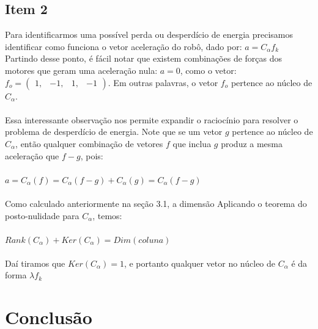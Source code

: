 \documentclass{article}
\begin{document}
\subsection{Item 2}
Para identificarmos uma possível perda ou desperdício de energia precisamos identificar como funciona o vetor aceleração do robô, dado por: 
$ a = C_{\alpha}f_{k}$ Partindo desse ponto, é fácil notar que existem combinações de forças dos motores que geram uma aceleração nula:
$ a = 0 $, como o vetor: $f_{o} = \begin{pmatrix} 1,&-1,&1,&-1\end{pmatrix}$. Em outras palavras, o vetor $f_{o}$ pertence ao núcleo de $C_{\alpha}$.
\\ \\
Essa interessante observação nos permite expandir o raciocínio para resolver o problema de desperdício de energia. Note que se um vetor $g$ pertence ao núcleo de $C_{\alpha}$, então qualquer combinação de vetores $f$ que inclua $g$
produz a mesma aceleração que $f - g$, pois:\\
\\  $ a = C_{\alpha}(f) = C_{\alpha}(f-g) + C_{\alpha}(g) = C_{\alpha}(f-g)$
\\ \\
Como calculado anteriormente na seção 3.1, a dimensão
Aplicando o teorema do posto-nulidade para $C_{\alpha}$, temos:
\\  \\ $ Rank(C_{\alpha}) + Ker(C_{\alpha}) = Dim(coluna)$ \\ \\
Daí tiramos que $Ker(C_{\alpha}) = 1 $, e portanto qualquer vetor no núcleo de $C_{\alpha}$ é da forma $\lambda f_{k}$

\section{Conclusão}
\end{document}
